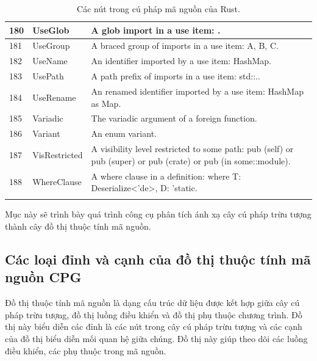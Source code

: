 \begin{longtable}{| p{} | p{} | p{} |}
180   & UseGlob                        & A glob import in a use item: \*.                                                                               \\ \hline
181   & UseGroup                       & A braced group of imports in a use item: {A, B, C}.                                                            \\ \hline
182   & UseName                        & An identifier imported by a use item: HashMap.                                                                 \\ \hline
183   & UsePath                        & A path prefix of imports in a use item: std::..                                                                \\ \hline
184   & UseRename                      & An renamed identifier imported by a use item: HashMap as Map.                                                  \\ \hline
185   & Variadic                       & The variadic argument of a foreign function.                                                                   \\ \hline
186   & Variant                        & An enum variant.                                                                                               \\ \hline
187   & VisRestricted                  & A visibility level restricted to some path: pub (self) or pub (super) or pub (crate) or pub (in some::module). \\ \hline
188   & WhereClause                    & A where clause in a definition: where T: Deserialize<'de>, D: 'static.                                         \\ \hline
\caption{Các nút trong cú pháp mã nguồn của Rust.}
\label{table:c3s_nodeastrust}
\end{longtable}
\medskip

Mục này sẽ trình bày quá trình công cụ phân tích ánh xạ cây cú pháp trừu tượng
thành cây đồ thị thuộc tính mã nguồn.

\subsection{Các loại đỉnh và cạnh của đồ thị thuộc tính mã nguồn CPG}

Đồ thị thuộc tính mã nguồn là dạng cấu trúc dữ liệu được kết hợp giữa cây cú pháp trừu tượng, đồ thị luồng điều khiển và đồ thị phụ thuộc chương trình.
Đồ thị này biểu diễn các đỉnh là các nút trong cây cú pháp trừu tượng và các cạnh của đồ thị biểu diễn mối quan hệ giữa chúng.
Đồ thị này giúp theo dõi các luồng điều khiển, các phụ thuộc trong mã nguồn.

